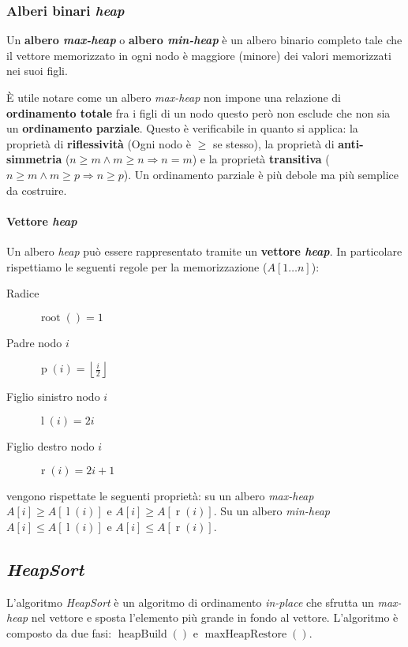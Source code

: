         \subsubsection{Alberi binari \textit{heap}}
            \begin{definition}
                Un \textbf{albero \textit{max-heap}} o \textbf{albero \textit{min-heap}} è un albero binario completo tale che il vettore memorizzato in ogni nodo è maggiore (minore) dei valori memorizzati nei suoi figli.
            \end{definition}
            È utile notare come un albero \textit{max-heap} non impone una relazione di \textbf{ordinamento totale} fra i figli di un nodo questo però non esclude che non sia un \textbf{ordinamento parziale}. Questo è verificabile in quanto si applica: la proprietà di \textbf{riflessività} (Ogni nodo è $\geq $ se stesso), la proprietà di \textbf{anti-simmetria} ($n\geq m \land m\geq n \Rightarrow n=m$) e la proprietà \textbf{transitiva} ($n\geq m \land m\geq p \Rightarrow n\geq p$).\newline
            Un ordinamento parziale è più debole ma più semplice da costruire.
            \paragraph{Vettore \textit{heap}} Un albero \textit{heap} può essere rappresentato tramite un \textbf{vettore \textit{heap}}. In particolare rispettiamo le seguenti regole per la memorizzazione ($A[1\dots n]$):
            \begin{description}
                \item[Radice] $\operatorname{root}()=1$
                \item[Padre nodo $i$] $\operatorname{p}(i)=\left\lfloor\frac{i}{2}\right\rfloor$
                \item[Figlio sinistro nodo $i$] $\operatorname{l}(i)=2i$
                \item[Figlio destro nodo $i$] $\operatorname{r}(i)=2i+1$
            \end{description}
            vengono rispettate le seguenti proprietà: su un albero \textit{max-heap} $A[i]\geq A[\operatorname{l}(i)]$ e $A[i]\geq A[\operatorname{r}(i)]$. Su un albero \textit{min-heap} $A[i]\leq A[\operatorname{l}(i)]$ e $A[i]\leq A[\operatorname{r}(i)]$.
    \subsection{\textit{HeapSort}}
        L'algoritmo \textit{HeapSort} è un algoritmo di ordinamento \textit{in-place} che sfrutta un \textit{max-heap} nel vettore e sposta l'elemento più grande in fondo al vettore. L'algoritmo è composto da due fasi: $\operatorname{heapBuild}()$ e $\operatorname{maxHeapRestore}()$.
